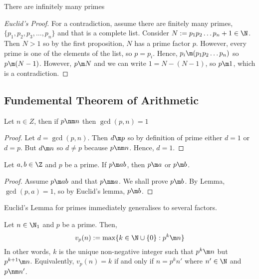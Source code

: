 \begin{nthm}
  There are infinitely many primes
\end{nthm}

\begin{proof}[Euclid's Proof]
  For a contradiction, assume there are finitely many primes, $\{p_1, p_2, p_3, \dots, p_n\}$ and that is a complete list. Consider $N := p_1p_2\dots p_n + 1 \in \N$. Then $N > 1$ so by the first proposition, $N$ has a prime factor $p$. However, every prime is one of the elements of the list, so $p = p_i$. Hence, $p_i \m (p_1p_2\dots p_n)$ so $p \m (N - 1)$. However, $p \m N$ and we can write $1 = N - (N - 1)$, so $p \m 1$, which is a contradiction.
\end{proof}

\subsection{Fundemental Theorem of Arithmetic}

\begin{nlemma}
  Let $n \in Z$, then if $p \nm n$ then $\gcd(p,n)=1$
\end{nlemma}
\begin{proof}
  Let $d = \gcd(p, n)$. Then $d \m p$ so by definition of prime either $d = 1$ or $d = p$. But $d \m n$ so $d \ne p$ because $p \nm n$. Hence, $d = 1$.
\end{proof}

\begin{nthm}
  Let $a, b \in \Z$ and $p$ be a prime. If $p \m ab$, then $p \m a$ or $p \m b$.
\end{nthm}
\begin{proof}
  Assume $p \m ab$ and that $p \nm a$. We shall prove $p \m b$. By Lemma, $\gcd(p, a) = 1$, so by Euclid's lemma, $p \m b$.
\end{proof}

\begin{remark}
   Euclid's Lemma for primes immediately generalises to several factors.
\end{remark}

\begin{ndefi}[]
  Let $n\in \N_1$ and $p$ be a prime. Then,
  $$ v_p (n) := \max \{k \in \N \cup \{0\} : p^k \m n\}  $$
  In other words, $k$ is the unique non-negative integer such that $p^k \m n$ but $p^{k+1} \m n$. Equivalently, $v_p (n) = k$ if and only if $n = p^k n'$ where $n' \in \N$ and $p \nm n'$.
\end{ndefi}

